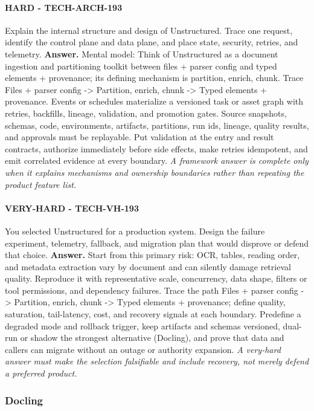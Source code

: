 \paragraph{HARD - TECH-ARCH-193} Explain the internal structure and design of Unstructured. Trace one request, identify the control plane and data plane, and place state, security, retries, and telemetry.
\textbf{Answer.} Mental model: Think of Unstructured as a document ingestion and partitioning toolkit between files + parser config and typed elements + provenance; its defining mechanism is partition, enrich, chunk. Trace Files + parser config -> Partition, enrich, chunk -> Typed elements + provenance. Events or schedules materialize a versioned task or asset graph with retries, backfills, lineage, validation, and promotion gates. Source snapshots, schemas, code, environments, artifacts, partitions, run ids, lineage, quality results, and approvals must be replayable. Put validation at the entry and result contracts, authorize immediately before side effects, make retries idempotent, and emit correlated evidence at every boundary.
\textit{A framework answer is complete only when it explains mechanisms and ownership boundaries rather than repeating the product feature list.}
\paragraph{VERY-HARD - TECH-VH-193} You selected Unstructured for a production system. Design the failure experiment, telemetry, fallback, and migration plan that would disprove or defend that choice.
\textbf{Answer.} Start from this primary risk: OCR, tables, reading order, and metadata extraction vary by document and can silently damage retrieval quality. Reproduce it with representative scale, concurrency, data shape, filters or tool permissions, and dependency failures. Trace the path Files + parser config -> Partition, enrich, chunk -> Typed elements + provenance; define quality, saturation, tail-latency, cost, and recovery signals at each boundary. Predefine a degraded mode and rollback trigger, keep artifacts and schemas versioned, dual-run or shadow the strongest alternative (Docling), and prove that data and callers can migrate without an outage or authority expansion.
\textit{A very-hard answer must make the selection falsifiable and include recovery, not merely defend a preferred product.}
\subsubsection*{Docling}
